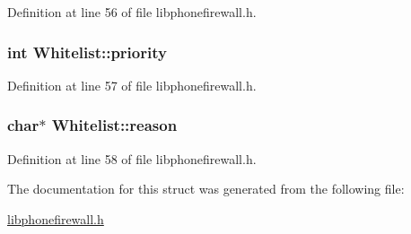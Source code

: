 Definition at line 56 of file libphonefirewall.h.\hypertarget{structWhitelist_a88dab00804dbe50d9255e0fa75d1438}{
\subsubsection{\setlength{\rightskip}{0pt plus 5cm}int {\bf Whitelist::priority}}}
\label{structWhitelist_a88dab00804dbe50d9255e0fa75d1438}




Definition at line 57 of file libphonefirewall.h.\hypertarget{structWhitelist_22d667946147519356f386dee8a05a17}{
\subsubsection{\setlength{\rightskip}{0pt plus 5cm}char$\ast$ {\bf Whitelist::reason}}}
\label{structWhitelist_22d667946147519356f386dee8a05a17}




Definition at line 58 of file libphonefirewall.h.

The documentation for this struct was generated from the following file:\begin{CompactItemize}
\item 
\hyperlink{libphonefirewall_8h}{libphonefirewall.h}\end{CompactItemize}
